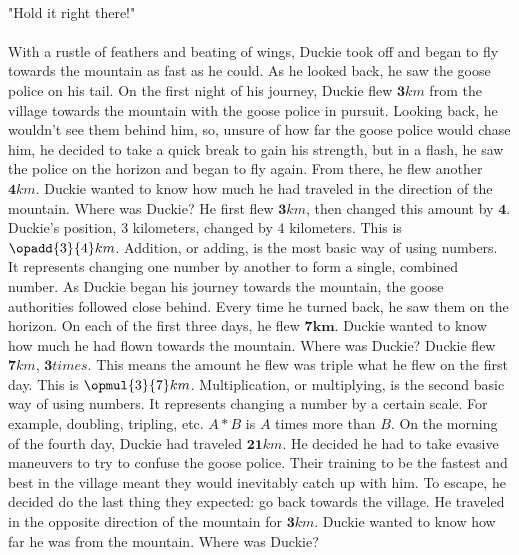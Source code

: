 \paragraph{} "Hold it right there!"
\paragraph{} With a rustle of feathers and beating of wings, Duckie took off and began to fly towards the mountain as fast as he could. As he looked back, he saw the goose police on his tail. 
\vfill
\pagebreak
{On the first night of his journey, Duckie flew $\mathbf{3} km$ from the village towards the mountain with the goose police in pursuit. Looking back, he wouldn't see them behind him, so, unsure of how far the goose police would chase him, he decided to take a quick break to gain his strength, but in a flash, he saw the police on the horizon and began to fly again. From there, he flew another $\mathbf{4} km$. Duckie wanted to know how much he had traveled in the direction of the mountain. Where was Duckie?}
{He first flew $\mathbf{3} km$, then changed this amount by $\mathbf{4}$. Duckie's position, 3 kilometers, changed by 4 kilometers. This is $\opadd{3}{4} km$.}
{Addition, or adding, is the most basic way of using numbers. It represents changing one number by another to form a single, combined number.} 
{}
{As Duckie began his journey towards the mountain, the goose authorities followed close behind. Every time he turned back, he saw them on the horizon. On each of the first three days, he flew $\mathbf{7km}$. Duckie wanted to know how much he had flown towards the mountain. Where was Duckie?}
{Duckie flew $\mathbf{7} km$, $\mathbf{3} times$. This means the amount he flew was triple what he flew on the first day. This is $\opmul{3}{7} km$.}
{Multiplication, or multiplying, is the second basic way of using numbers. It represents changing a number by a certain scale. For example, doubling, tripling, etc. $A\ast B$ is $A$ times more than $B$.}
{}
{On the morning of the fourth day, Duckie had traveled $\mathbf{21} km$. He decided he had to take evasive maneuvers to try to confuse the goose police. Their training to be the fastest and best in the village meant they would inevitably catch up with him. To escape, he decided do the last thing they expected: go back towards the village. He traveled in the opposite direction of the mountain for $\mathbf{3} km$. Duckie wanted to know how far he was from the mountain. Where was Duckie?}
